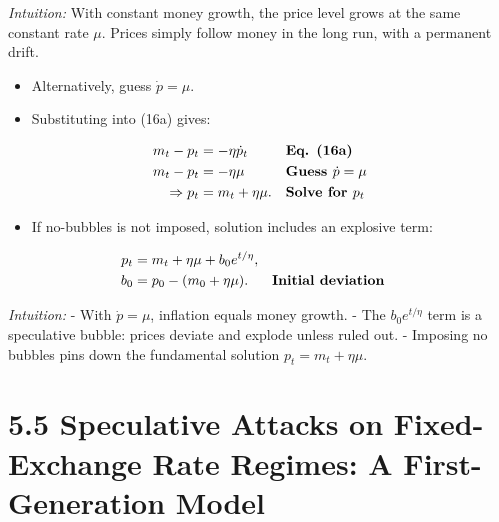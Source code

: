 \documentclass[12pt]{article}
\begin{document}
\textit{Intuition:} With constant money growth, the price level grows at the same constant rate $\mu$.  
Prices simply follow money in the long run, with a permanent drift.

\begin{itemize}
    \item Alternatively, guess $\dot{p} = \mu$.
    \item Substituting into (16a) gives:
\end{itemize}

\singlespacing
\begin{align}
m_t - p_t &= -\eta \dot{p}_t && \text{\textbf{Eq. (16a)}} \\
m_t - p_t &= -\eta\mu && \text{\textbf{Guess $\dot{p}=\mu$}} \\
\Rightarrow p_t &= m_t + \eta\mu. && \text{\textbf{Solve for $p_t$}}
\end{align}

\begin{itemize}
    \item If no-bubbles is not imposed, solution includes an explosive term:
\end{itemize}

\singlespacing
\begin{align}
p_t &= m_t + \eta\mu + b_0 e^{t/\eta}, \\
b_0 &= p_0 - (m_0 + \eta\mu). && \text{\textbf{Initial deviation}}
\end{align}

\textit{Intuition:}  
- With $\dot{p}=\mu$, inflation equals money growth.  
- The $b_0 e^{t/\eta}$ term is a speculative bubble: prices deviate and explode unless ruled out.  
- Imposing no bubbles pins down the fundamental solution $p_t = m_t + \eta\mu$.  

\section*{\noindent\textbf{5.5 Speculative Attacks on Fixed-Exchange Rate Regimes: A First-Generation Model}}
\end{document}
